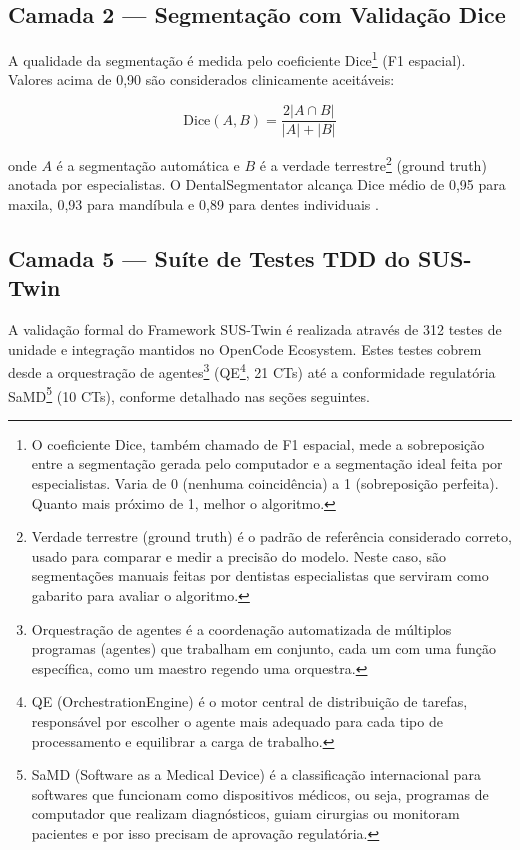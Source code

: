 \subsection{Camada 2 — Segmentação com Validação Dice}

A qualidade da segmentação é medida pelo coeficiente Dice\footnote{O coeficiente Dice, também chamado de F1 espacial, mede a sobreposição entre a segmentação gerada pelo computador e a segmentação ideal feita por especialistas. Varia de 0 (nenhuma coincidência) a 1 (sobreposição perfeita). Quanto mais próximo de 1, melhor o algoritmo.} (F1 espacial). Valores acima de 0,90 são considerados clinicamente aceitáveis:

\begin{equation}
    \text{Dice}(A,B) = \frac{2|A \cap B|}{|A| + |B|}
\end{equation}

onde $A$ é a segmentação automática e $B$ é a verdade terrestre\footnote{Verdade terrestre (ground truth) é o padrão de referência considerado correto, usado para comparar e medir a precisão do modelo. Neste caso, são segmentações manuais feitas por dentistas especialistas que serviram como gabarito para avaliar o algoritmo.} (ground truth) anotada por especialistas. O DentalSegmentator alcança Dice médio de 0,95 para maxila, 0,93 para mandíbula e 0,89 para dentes individuais \cite{dot2024dental}.

\subsection{Camada 5 — Suíte de Testes TDD do SUS-Twin}

A validação formal do Framework SUS-Twin é realizada através de 312 testes de unidade e integração mantidos no OpenCode Ecosystem. Estes testes cobrem desde a orquestração de agentes\footnote{Orquestração de agentes é a coordenação automatizada de múltiplos programas (agentes) que trabalham em conjunto, cada um com uma função específica, como um maestro regendo uma orquestra.} (QE\footnote{QE (OrchestrationEngine) é o motor central de distribuição de tarefas, responsável por escolher o agente mais adequado para cada tipo de processamento e equilibrar a carga de trabalho.}, 21 CTs) até a conformidade regulatória SaMD\footnote{SaMD (Software as a Medical Device) é a classificação internacional para softwares que funcionam como dispositivos médicos, ou seja, programas de computador que realizam diagnósticos, guiam cirurgias ou monitoram pacientes e por isso precisam de aprovação regulatória.} (10 CTs), conforme detalhado nas seções seguintes.


